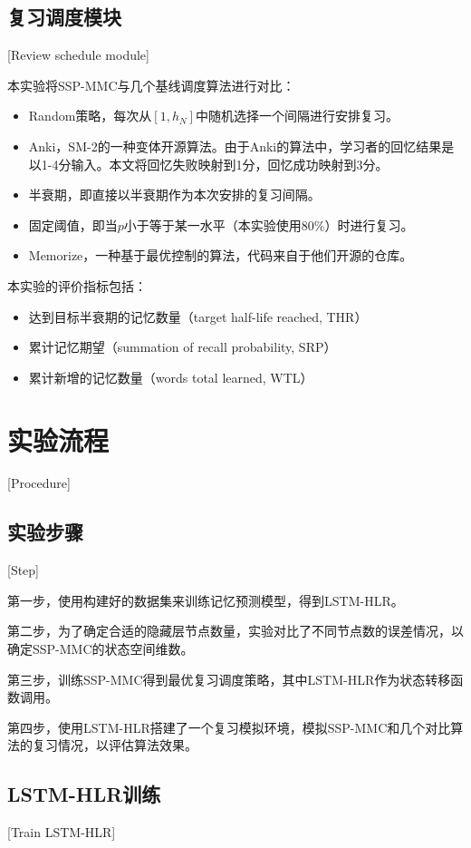 \subsection{复习调度模块}[Review schedule module]

本实验将SSP-MMC与几个基线调度算法进行对比：

\begin{itemize}
    \item Random策略，每次从$[1,h_N]$中随机选择一个间隔进行安排复习。
    \item Anki，SM-2的一种变体开源算法。由于Anki的算法中，学习者的回忆结果是以1-4分输入。本文将回忆失败映射到1分，回忆成功映射到3分。
    \item 半衰期，即直接以半衰期作为本次安排的复习间隔。
    \item 固定阈值，即当$p$小于等于某一水平（本实验使用80\%）时进行复习。
    \item Memorize\cite{tabibianEnhancingHumanLearning2019}，一种基于最优控制的算法，代码来自于他们开源的仓库。
\end{itemize}

本实验的评价指标包括：
\begin{itemize}
    \item 达到目标半衰期的记忆数量（target half-life reached, THR）
    \item 累计记忆期望（summation of recall probability, SRP）
    \item 累计新增的记忆数量（words total learned, WTL）
\end{itemize}

\section{实验流程}[Procedure]

\subsection{实验步骤}[Step]

第一步，使用构建好的数据集来训练记忆预测模型，得到LSTM-HLR。

第二步，为了确定合适的隐藏层节点数量，实验对比了不同节点数的误差情况，以确定SSP-MMC的状态空间维数。

第三步，训练SSP-MMC得到最优复习调度策略，其中LSTM-HLR作为状态转移函数调用。

第四步，使用LSTM-HLR搭建了一个复习模拟环境，模拟SSP-MMC和几个对比算法的复习情况，以评估算法效果。

\subsection{LSTM-HLR训练}[Train LSTM-HLR]

